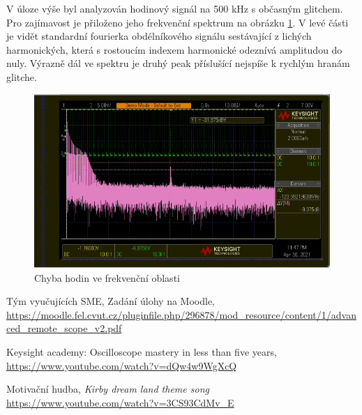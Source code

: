 \documentclass[twoside]{article}
\begin{document}
V úloze výše byl analyzován hodinový signál na 500 kHz s občasným glitchem. Pro zajímavost je přiloženo jeho frekvenční spektrum na obrázku \ref{fig:fft_clock_glitch}.
V levé části je vidět standardní fourierka obdélníkového signálu sestávající z lichých harmonických, která s rostoucím indexem harmonické odeznívá amplitudou do nuly.
Výrazně dál ve spektru je druhý peak příslušící nejspíše k rychlým hranám glitche.
\begin{figure}[htbp]
	\centering
	\includegraphics[width=0.8\linewidth]{clock_glitch_fft.png                    }
	\caption{Chyba hodin ve frekvenční oblasti }
	\label{fig:fft_clock_glitch}
\end{figure}

		\begin{thebibliography}{9}
			
			
			Tým vyučujících SME, Zadání úlohy na Moodle, \url{https://moodle.fel.cvut.cz/pluginfile.php/296878/mod_resource/content/1/advanced_remote_scope_v2.pdf}
			
			Keysight academy: Oscilloscope mastery in less than five years, \url{https://www.youtube.com/watch?v=dQw4w9WgXcQ}
			
			Motivační hudba, \emph{Kirby dream land theme song} \url{https://www.youtube.com/watch?v=3CS93CdMv_E}
			
		\end{thebibliography}
		
		
\end{document}
